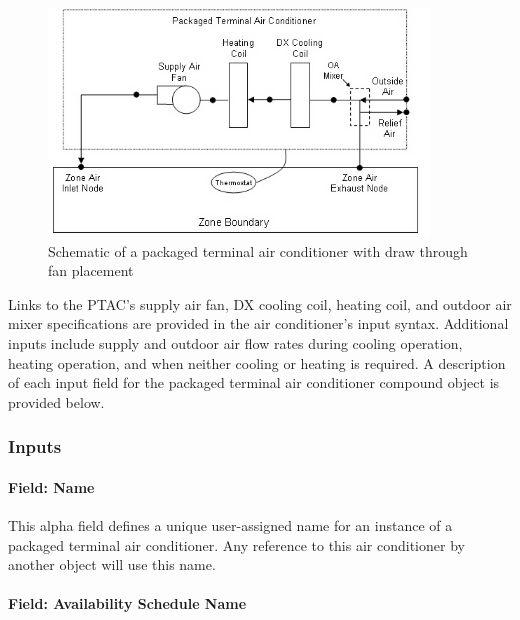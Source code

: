 \begin{figure}[hbtp] %
\centering
\includegraphics[width=0.9\textwidth, height=0.9\textheight, keepaspectratio=true]{media/image284.png}
\caption{  Schematic of a packaged terminal air conditioner with draw through fan placement \protect \label{fig:schematic-of-a-packaged-terminal-air-001}}
\end{figure}

Links to the PTAC's supply air fan, DX cooling coil, heating coil, and outdoor air mixer specifications are provided in the air conditioner's input syntax. Additional inputs include supply and outdoor air flow rates during cooling operation, heating operation, and when neither cooling or heating is required. A description of each input field for the packaged terminal air conditioner compound object is provided below.

\subsubsection{Inputs}\label{inputs-8-029}

\paragraph{Field: Name}\label{field-name-8-025}

This alpha field defines a unique user-assigned name for an instance of a packaged terminal air conditioner. Any reference to this air conditioner by another object will use this name.

\paragraph{Field: Availability Schedule Name}\label{field-availability-schedule-name-7-005}

